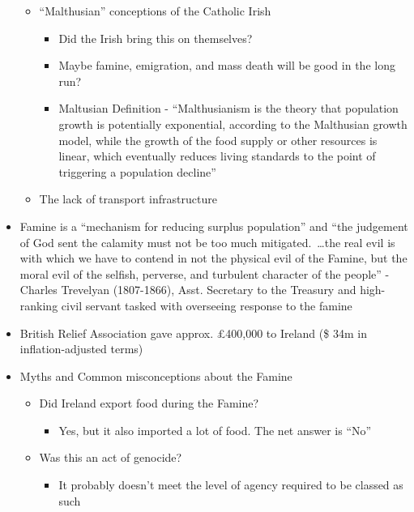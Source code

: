 \documentclass[12pt]{article}
\begin{document}
\begin{itemize}
\begin{itemize}
                    \item ``Malthusian'' conceptions of the Catholic Irish
                    \begin{itemize}
                        \item Did the Irish bring this on themselves?
                        \item Maybe famine, emigration, and mass death will be good in the long run?
                        \item Maltusian Definition - ``Malthusianism is the theory that population growth is potentially exponential, according to the Malthusian growth model, while the growth of the food supply or other resources is linear, which eventually reduces living standards to the point of triggering a population decline''
                    \end{itemize}
                    \item The lack of transport infrastructure
                \end{itemize}
                \item Famine is a ``mechanism for reducing surplus population'' and ``the judgement of God sent the calamity must not be too much mitigated.\ \dots the real evil is with which we have to contend in not the physical evil of the Famine, but the moral evil of the selfish, perverse, and turbulent character of the people'' -Charles Trevelyan (1807-1866), Asst. Secretary to the Treasury and high-ranking civil servant tasked with overseeing response to the famine
                \item British Relief Association gave approx. £400,000 to Ireland (\$ 34m in inflation-adjusted terms)
                \item Myths and Common misconceptions about the Famine
                \begin{itemize}
                    \item Did Ireland export food during the Famine?
                    \begin{itemize}
                        \item Yes, but it also imported a lot of food. The net answer is ``No''
                    \end{itemize}
                    \item Was this an act of genocide?
                    \begin{itemize}
                        \item It probably doesn't meet the level of agency required to be classed as such

\end{itemize}
\end{itemize}
\end{itemize}
\end{document}
